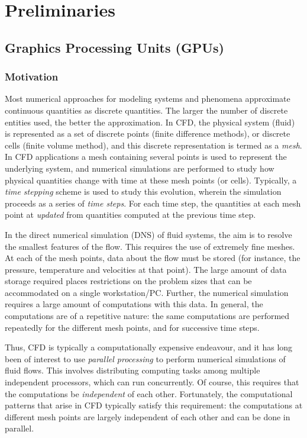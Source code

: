 \chapter{Preliminaries}


\section{Graphics Processing Units (GPUs)}

\subsection{Motivation}

Most numerical approaches for modeling systems and phenomena
approximate continuous quantities as discrete quantities.
The larger the number of discrete entities used,
the better the approximation.
In CFD, the physical system (fluid)
is represented as a set of discrete points (finite difference methods),
or discrete cells (finite volume method),
and this discrete representation is termed as a \emph{mesh}.
In CFD applications
a mesh containing several points is used
to represent the underlying system,
and numerical simulations are performed
to study how physical quantities
change with time at these mesh points (or cells).
Typically, a \emph{time stepping} scheme is used to study this evolution,
wherein the simulation proceeds as a series of \emph{time steps}.
For each time step, the quantities at each mesh point at
\emph{updated} from quantities computed at the previous time step.

In the direct numerical simulation (DNS) of fluid systems,
the aim is to resolve the smallest features of the flow.
This requires the use of extremely fine meshes.
At each of the mesh points,
data about the flow must be stored
(for instance, the pressure, temperature and velocities at that point).
The large amount of data storage required places
restrictions on the problem sizes that can be accommodated
on a single workstation/PC.
Further,
the numerical simulation requires a large amount of
computations with this data.
In general, the computations are of a repetitive nature:
the same computations are performed repeatedly
for the different mesh points,
and for successive time steps.

Thus, CFD is typically a computationally expensive endeavour,
and it has long been of interest to use
\emph{parallel processing} to
perform numerical simulations of fluid flows.
This involves distributing computing tasks
among multiple independent processors,
which can run concurrently.
Of course, this requires that the computations be \emph{independent}
of each other.
Fortunately, the computational patterns that arise in CFD
typically satisfy this requirement:
the computations at different mesh points are largely independent
of each other and can be done in parallel.

